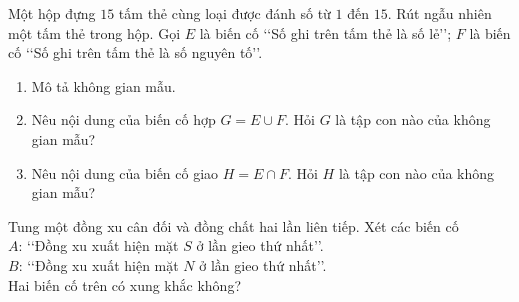 \begin{vd}[Mức 1]%
	Một hộp đựng $15$ tấm thẻ cùng loại được đánh số từ $1$ đến $15$. Rút ngẫu nhiên một tấm thẻ trong hộp. Gọi $E$ là biến cố \lq\lq Số ghi trên tấm thẻ là số lẻ\rq\rq; $F$ là biến cố \lq\lq Số ghi trên tấm thẻ là số nguyên tố\rq\rq.
	\begin{enumerate}
		\item Mô tả không gian mẫu.
		\item Nêu nội dung của biến cố hợp $G = E\cup F$. Hỏi $G$ là tập con nào của không gian mẫu?
		\item Nêu nội dung của biến cố giao $H = E\cap F$. Hỏi $H$ là tập con nào của không gian mẫu?
	\end{enumerate}
\end{vd}

\begin{vd}[Mức 1]%
	Tung một đồng xu cân đối và đồng chất hai lần liên tiếp. Xét các biến cố\\
	$A$: \lq\lq Đồng xu xuất hiện mặt $S$ ở lần gieo thứ nhất\rq\rq.\\
	$B$: \lq\lq Đồng xu xuất hiện mặt $N$ ở lần gieo thứ nhất\rq\rq.\\
	Hai biến cố trên có xung khắc không?
\end{vd}

